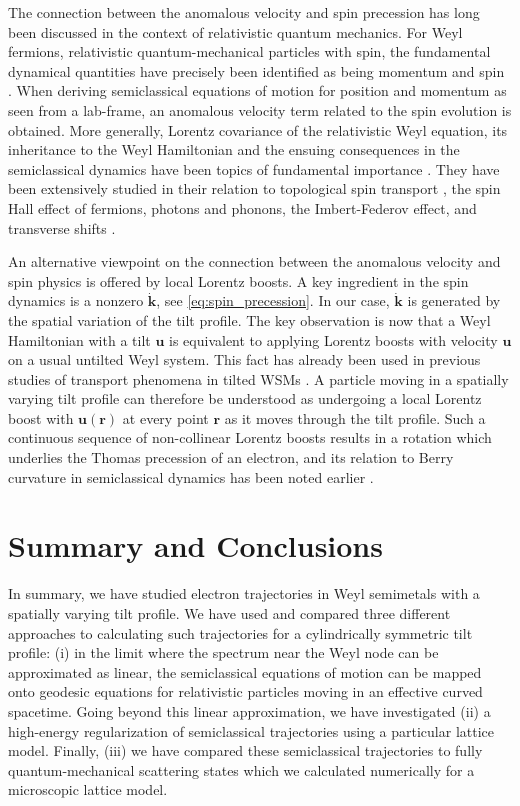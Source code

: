 \documentclass[submission, Phys]{SciPost}
\begin{document}
The connection between the anomalous velocity and spin precession has long been discussed in the context of relativistic quantum mechanics. For Weyl fermions, relativistic quantum-mechanical particles with spin, the {fundamental} dynamical quantities have precisely been identified as being momentum and spin \cite{Dixon:1970,Papapetrou}. When deriving semiclassical equations of motion for position and momentum as seen from a lab-frame, an anomalous velocity term related to the spin evolution is obtained\cite{MStone}. More generally, Lorentz covariance of the relativistic Weyl equation, its inheritance to the Weyl Hamiltonian and the ensuing consequences in the semiclassical dynamics have been topics of fundamental importance \cite{Chen_2014, MStone, Duval_2015a,Duval_2015b,ELBISTAN2015502,Stone15,Stone16,ANDRZEJEWSKI2015417}. They have been extensively studied in their relation to topological spin transport \cite{Bliokh_2005,Berard:2004xn}, the spin Hall effect of fermions\cite{ZHANG2015507}, photons \cite{Onoda04,Oancea20,Harte22} and phonons\cite{Bliokh06}, the Imbert-Federov effect, and transverse shifts \cite{Lason-Bolonek:2016yvf}.

An alternative viewpoint on the connection between the anomalous velocity and spin physics is offered by local Lorentz boosts. A key ingredient in the spin dynamics is a nonzero $\dot{\bm{k}}$, see \cref{eq:spin_precession}. In our case, $\dot{\bm k}$ is generated by the spatial variation of the tilt profile. The key observation is now that a Weyl Hamiltonian with a tilt $\bm{u}$ is equivalent to applying Lorentz boosts with velocity $\bm{u}$  on a usual untilted Weyl system. This fact has already been used in previous studies of transport phenomena in tilted WSMs \cite{Tchoumakov16,Yu16,Rostamzadeh19}. A particle moving in a spatially varying tilt profile can therefore be understood as undergoing a local Lorentz boost with $\bm{u}(\bm{r})$  at every point $\bm{r}$ as it moves through the tilt profile. Such a continuous sequence of non-collinear Lorentz boosts results in a rotation which underlies the Thomas precession of an electron, and its relation to Berry curvature in semiclassical dynamics has been noted earlier \cite{MStone}.

\section{Summary and Conclusions}
\label{sec:Summary}

In summary, we have studied electron trajectories in Weyl semimetals with a spatially varying tilt profile. We have used and compared three different approaches to calculating such trajectories for a cylindrically symmetric tilt profile: (i) in the limit where the spectrum near the Weyl node can be approximated as linear, the semiclassical equations of motion can be mapped onto geodesic equations for relativistic particles moving in an effective curved spacetime.
Going beyond this linear approximation, we have investigated (ii) a high-energy regularization of semiclassical trajectories using a particular lattice model.
Finally, (iii) we have compared these semiclassical trajectories to fully quantum-mechanical scattering states which we calculated numerically for a microscopic lattice model.
\end{document}
